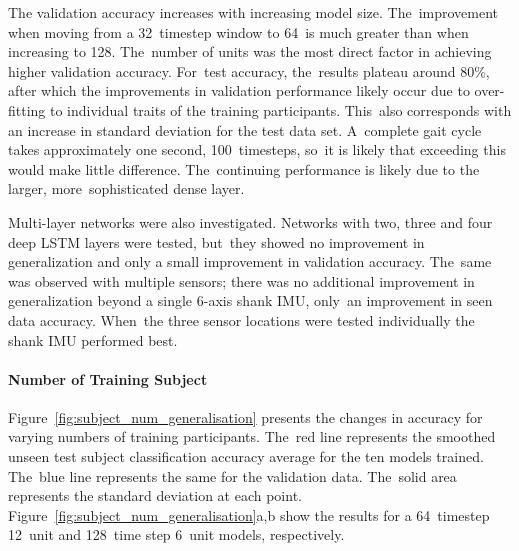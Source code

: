 The validation accuracy increases with increasing model size. The~improvement when moving from a 32~timestep window to 64~is much greater than when increasing to 128. The~number of units was the most direct factor in achieving higher validation accuracy. For~test accuracy, the~results plateau around 80\%, after which the improvements in validation performance likely occur due to over-fitting to individual traits of the training participants. This~also corresponds with an increase in standard deviation for the test data set. A~complete gait cycle takes approximately one second, 100~timesteps, so~it is likely that exceeding this would make little difference. The~continuing performance is likely due to the larger, more~sophisticated dense layer.

Multi-layer networks were also investigated. Networks with two, three and four deep LSTM layers were tested, but~they showed no improvement in generalization and only a small improvement in validation accuracy. The~same was observed with multiple sensors; there was no additional improvement in generalization beyond a single 6-axis shank IMU, only~an improvement in seen data accuracy. When~the three sensor locations were tested individually the shank IMU performed best.


\paragraph{Number of Training Subject}
Figure~\ref{fig:subject_num_generalisation} presents the changes in accuracy for varying numbers of training participants. The~red line represents the smoothed unseen test subject classification accuracy average for the ten models trained. The~blue line represents the same for the validation data. The~solid area represents the standard deviation at each point. Figure~\ref{fig:subject_num_generalisation}a,b show the results for a 64~timestep 12~unit and 128~time step 6~unit models, respectively.



